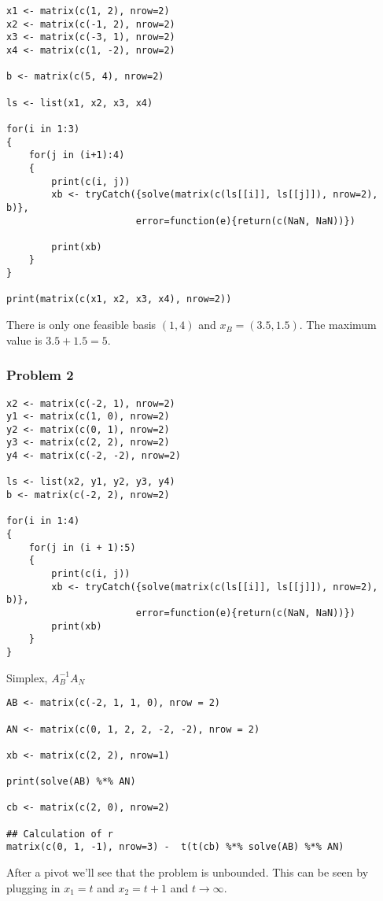 \documentclass[11pt]{article}
\begin{document}
\begin{verbatim}
x1 <- matrix(c(1, 2), nrow=2)
x2 <- matrix(c(-1, 2), nrow=2)
x3 <- matrix(c(-3, 1), nrow=2)
x4 <- matrix(c(1, -2), nrow=2)

b <- matrix(c(5, 4), nrow=2)

ls <- list(x1, x2, x3, x4)

for(i in 1:3)
{
    for(j in (i+1):4)
    {
        print(c(i, j))
        xb <- tryCatch({solve(matrix(c(ls[[i]], ls[[j]]), nrow=2), b)},
                       error=function(e){return(c(NaN, NaN))})

        print(xb)
    }
}

print(matrix(c(x1, x2, x3, x4), nrow=2))
\end{verbatim}

There is only one feasible basis \((1, 4)\) and \(x_B = (3.5, 1.5)\). The
maximum value is \(3.5 + 1.5 = 5\).
\subsubsection{Problem 2}
\label{sec:org9090b77}
\begin{verbatim}
x2 <- matrix(c(-2, 1), nrow=2)
y1 <- matrix(c(1, 0), nrow=2)
y2 <- matrix(c(0, 1), nrow=2)
y3 <- matrix(c(2, 2), nrow=2)
y4 <- matrix(c(-2, -2), nrow=2)

ls <- list(x2, y1, y2, y3, y4)
b <- matrix(c(-2, 2), nrow=2)

for(i in 1:4)
{
    for(j in (i + 1):5)
    {
        print(c(i, j))
        xb <- tryCatch({solve(matrix(c(ls[[i]], ls[[j]]), nrow=2), b)},
                       error=function(e){return(c(NaN, NaN))})
        print(xb)
    }
}
\end{verbatim}

Simplex, \(A_B^{-1}A_N\)

\begin{verbatim}
AB <- matrix(c(-2, 1, 1, 0), nrow = 2)

AN <- matrix(c(0, 1, 2, 2, -2, -2), nrow = 2)

xb <- matrix(c(2, 2), nrow=1)

print(solve(AB) %*% AN)

cb <- matrix(c(2, 0), nrow=2)

## Calculation of r
matrix(c(0, 1, -1), nrow=3) -  t(t(cb) %*% solve(AB) %*% AN)
\end{verbatim}

After a pivot we'll see that the problem is unbounded. This can be seen by
plugging in \(x_1 = t\) and \(x_2 = t +1\) and \(t \rightarrow \infty\).
\end{document}

